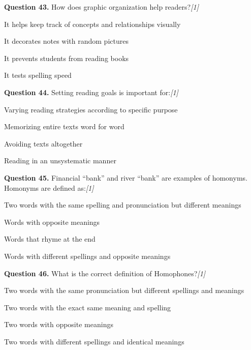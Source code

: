 \documentclass[11pt,a4paper]{article}
\newcommand{\pts}[1]{\hfill   \textit{[#1]}}
\begin{document}
\medskip




\noindent   \textbf{Question 43.} How does graphic organization help readers?\pts{1}

\begin{parts}
  \item It helps keep track of concepts and relationships visually
  \item It decorates notes with random pictures
  \item It prevents students from reading books
  \item It tests spelling speed
\end{parts}

\medskip




\noindent   \textbf{Question 44.} Setting reading goals is important for:\pts{1}

\begin{parts}
  \item Varying reading strategies according to specific purpose
  \item Memorizing entire texts word for word
  \item Avoiding texts altogether
  \item Reading in an unsystematic manner
\end{parts}

\medskip




\noindent   \textbf{Question 45.} Financial ``bank'' and river ``bank'' are examples of homonyms. Homonyms are defined as:\pts{1}

\begin{parts}
  \item Two words with the same spelling and pronunciation but different meanings
  \item Words with opposite meanings
  \item Words that rhyme at the end
  \item Words with different spellings and opposite meanings
\end{parts}

\medskip




\noindent   \textbf{Question 46.} What is the correct definition of Homophones?\pts{1}

\begin{parts}
  \item Two words with the same pronunciation but different spellings and meanings
  \item Two words with the exact same meaning and spelling
  \item Two words with opposite meanings
  \item Two words with different spellings and identical meanings
\end{parts}
\end{document}
